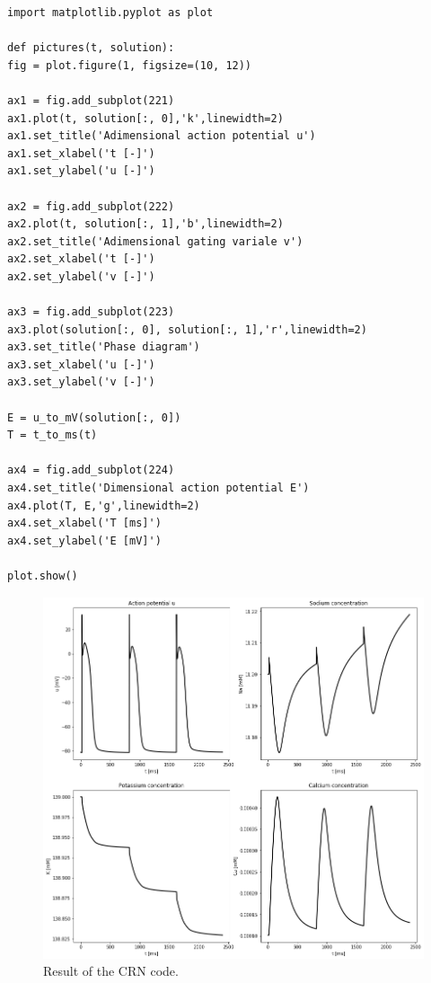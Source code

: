 \documentclass[11pt,a4paper]{article}
\begin{document}
\lstset{language=Python}
\lstset{frame=lines}
\lstset{basicstyle=\footnotesize}
\begin{lstlisting}
import matplotlib.pyplot as plot  

def pictures(t, solution):
fig = plot.figure(1, figsize=(10, 12))

ax1 = fig.add_subplot(221)
ax1.plot(t, solution[:, 0],'k',linewidth=2)
ax1.set_title('Adimensional action potential u')
ax1.set_xlabel('t [-]')
ax1.set_ylabel('u [-]')

ax2 = fig.add_subplot(222)
ax2.plot(t, solution[:, 1],'b',linewidth=2)
ax2.set_title('Adimensional gating variale v')
ax2.set_xlabel('t [-]')
ax2.set_ylabel('v [-]')

ax3 = fig.add_subplot(223)
ax3.plot(solution[:, 0], solution[:, 1],'r',linewidth=2)
ax3.set_title('Phase diagram')
ax3.set_xlabel('u [-]')
ax3.set_ylabel('v [-]')

E = u_to_mV(solution[:, 0])
T = t_to_ms(t)

ax4 = fig.add_subplot(224)
ax4.set_title('Dimensional action potential E')
ax4.plot(T, E,'g',linewidth=2)
ax4.set_xlabel('T [ms]')
ax4.set_ylabel('E [mV]')

plot.show()
\end{lstlisting}
\begin{figure}[ht!]
	\centering
	\includegraphics[width=1\textwidth]{./Images/CRN.png}
	\caption{Result of the CRN code.}
	\label{fig:crn}
\end{figure} 
\end{document}
